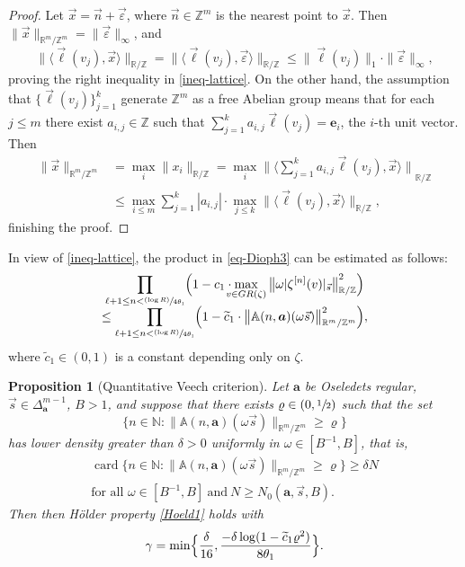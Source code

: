 \documentclass[JEP,XML,SOM,Unicode]{cedram}
\newcommand{\sep}{:}
\newcommand\shalf{\sfrac{1}{2}}
\newcommand{\psfrac}[2]{\sfrac{(#1)}{#2}}
\let\epsilon\varepsilon
\theoremstyle{plain}
\newtheorem{prop}[theorem]{Proposition}
\theoremstyle{definition}
\let\wt\widetilde
\DeclareMathOperator{\card}{card}
\newcommand\bom{{\boldsymbol a}}\let\ba\bom
\newcommand\eb{{\boldsymbol e}}
\let\gam\gamma
\let\om\omega
\newcommand\Aa{\mathbb{A}}
\newcommand{\R}{\mathbb{R}}
\newcommand{\Z}{\mathbb{Z}}
\newcommand{\N}{\mathbb{N}}
\newcommand\be{\begin{equation}}
\newcommand\ee{\end{equation}}
\begin{document}
\begin{proof}
Let $\vec{x} = \vec{n} + \vec{\epsilon}$, where $\vec n\in \Z^m$ is the nearest point to $\vec x$. Then $\|\vec x\|_{\R^m/\Z^m}= \|\vec{\epsilon}\|_\infty$, and
\[
\|\langle \vec\ell(v_j), \vec{x}\rangle \|_{\R/\Z} = \|\langle \vec\ell(v_j), \vec{\epsilon}\rangle \|_{\R/\Z} \le \|\vec\ell(v_j)\|_1\cdot \|\vec{\epsilon}\|_\infty,
\]
proving the right inequality in \eqref{ineq-lattice}. On the other hand, the assumption that $\{\vec\ell(v_j)\}_{j=1}^k$ generate $\Z^m$ as a free Abelian group means that for each $j\le m$ there exist $a_{i,j}\in \Z$ such that $\sum_{j=1}^k a_{i,j} \vec\ell(v_j) = \eb_i$, the $i$-th unit vector. Then
\begin{align*}
\|\vec{x}\|_{\R^m/\Z^m} &= \max_i \|x_i\|_{\R/\Z} = \max_i {\bigl\|\bigl\langle\textstyle\sum_{j=1}^k a_{i,j} \vec\ell(v_j), \vec x \bigr\rangle \bigr\|}_{\R/\Z}\\[-5pt]
&\le \max_{i\le m}\sum_{j=1}^k |a_{i,j}| \cdot
\max_{j\le k} \|\langle \vec\ell(v_j), \vec{x}\rangle \|_{\R/\Z},
\end{align*}
finishing the proof.
\end{proof}

In view of \eqref{ineq-lattice}, the product in \eqref{eq-Dioph3} can be estimated as follows:
\begin{multline}
\label{lattice}
\prod_{\ell+1\le n < \psfrac{\log R}{4\theta_1}}
\Bigl( 1 - c_1\cdot \!\!\!\! \max_{v\in GR(\zeta)}{\bigl\| \om|\zeta^{[n]}(v)|_{\vec{s}}\bigr\|}^2_{\R/\Z}\Bigr)\\[-5pt]
\le \prod_{\ell+1 \le n < \psfrac{\log R}{4\theta_1}} \Bigl( 1 - \wt c_1\cdot \bigl\|\Aa(n,\bom) (\om\vec{s})\bigr\|^2_{\R^m/\Z^m} \Bigr),
\end{multline}
where $\wt c_1\in (0,1)$ is a constant depending only on $\zeta$.

\begin{prop}[Quantitative Veech criterion] \label{prop-quant}
Let $\bom$ be Oseledets regular, $\vec s\in \Delta_{\bom}^{m-1}$, $B>1$, and suppose that there exists $\varrho\in (0,\shalf)$ such that the set
\[
\bigl\{n\in \N\sep \big\|\Aa(n,\bom) (\om\vec{s})\bigr\|_{\R^m/\Z^m} \ge \varrho\bigr\}
\]
has lower density greater than $\delta>0$ uniformly in $\om\in [B^{-1},B]$, that is,
\begin{multline}
\label{eq-densi}
\card \bigl\{n\in \N\sep \big\|\Aa(n,\bom) (\om\vec{s})\bigr\|_{\R^m/\Z^m} \ge \varrho\bigr\} \ge \delta N\\
\text{for all }\om\in [B^{-1},B]\ \text{and}\ N \ge N_0(\bom,\vec s, B).
\end{multline}
Then then Hölder property \eqref{Hoeld1} holds with
\be \label{def-gamma}
\gam= \min\Bigl\{\frac{\delta}{16},\frac{-\delta\log(1-\wt c_1\varrho^2)}{8\theta_1}\Bigr\}.
\ee
\end{prop}
\end{document}
